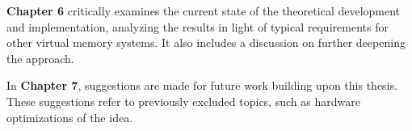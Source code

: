 \textbf{Chapter 6} critically examines the current state of the theoretical development and implementation, analyzing the results in light of typical requirements for other virtual memory systems. It also includes a discussion on further deepening the approach.

In \textbf{Chapter 7}, suggestions are made for future work building upon this thesis. These suggestions refer to previously excluded topics, such as hardware optimizations of the idea.










